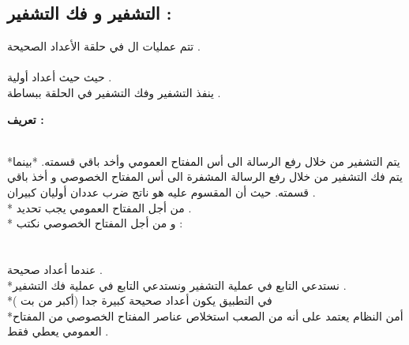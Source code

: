 \documentclass[11pt,a4paper]{report}
\begin{document}
\begin{otherlanguage}{arabic}
\chapter{التشفير و فك التشفير :}
\begin{otherlanguage}{arabic}
\begin{center}
تتم عمليات ال   في حلقة الأعداد الصحيحة  .
\\
\textit{}
\\
حيث \textit{ } حيث \textit{} أعداد أولية .
\\
ينفذ التشفير وفك التشفير في الحلقة ببساطة .
\\
\begin{flushleft}
\textbf{تعريف :}
\end{flushleft}
\\
*يتم التشفير من خلال رفع الرسالة الى أس المفتاح العمومي وأخد باقي قسمته.
\newline
*بينما يتم فك التشفير  من خلال رفع الرسالة المشفرة الى أس المفتاح الخصوصي و أخذ باقي قسمته.
\newline
حيث أن المقسوم عليه هو ناتج ضرب عددان أوليان كبيران .
\\
* من أجل المفتاح العمومي يجب تحديد  .
\\
* و من أجل المفتاح الخصوصي نكتب :
\\
\textit{}
\\
\textit{}
\\
عندما \textit{} أعداد صحيحة .
\\
*نستدعي التابع  في عملية التشفير ونستدعي التابع   في عملية فك التشفير .
\\
*في التطبيق يكون  أعداد صحيحة كبيرة جدا (أكبر من  بت ) 
\\
*أمن النظام يعتمد على أنه من الصعب استخلاص عناصر المفتاح الخصوصي    من المفتاح العمومي يعطي فقط  .




\end{center}
\end{otherlanguage}

\end{otherlanguage}
\end{document}
